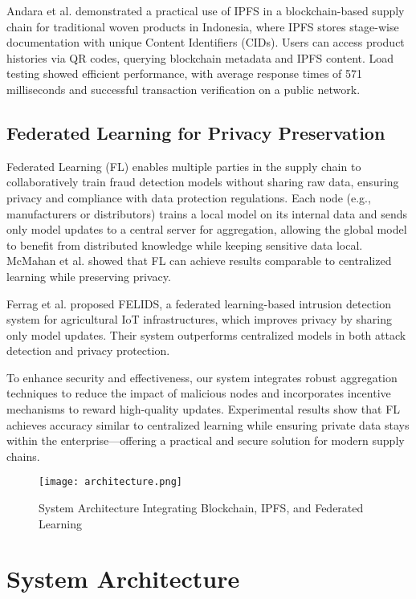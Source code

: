 \documentclass[conference]{IEEEtran}
\begin{document}
Andara et al. \cite{andara2022blockchain} demonstrated a practical use of IPFS in a blockchain-based supply chain for traditional woven products in Indonesia, where IPFS stores stage-wise documentation with unique Content Identifiers (CIDs). Users can access product histories via QR codes, querying blockchain metadata and IPFS content. Load testing showed efficient performance, with average response times of 571 milliseconds and successful transaction verification on a public network.

\subsection{Federated Learning for Privacy Preservation}  
Federated Learning (FL) enables multiple parties in the supply chain to collaboratively train fraud detection models without sharing raw data, ensuring privacy and compliance with data protection regulations. Each node (e.g., manufacturers or distributors) trains a local model on its internal data and sends only model updates to a central server for aggregation, allowing the global model to benefit from distributed knowledge while keeping sensitive data local. McMahan et al. \cite{mcmahan2017communication} showed that FL can achieve results comparable to centralized learning while preserving privacy.

Ferrag et al. \cite{ferrag2020deep} proposed FELIDS, a federated learning-based intrusion detection system for agricultural IoT infrastructures, which improves privacy by sharing only model updates. Their system outperforms centralized models in both attack detection and privacy protection.

To enhance security and effectiveness, our system integrates robust aggregation techniques to reduce the impact of malicious nodes and incorporates incentive mechanisms to reward high-quality updates. Experimental results show that FL achieves accuracy similar to centralized learning while ensuring private data stays within the enterprise—offering a practical and secure solution for modern supply chains.

\begin{figure*}[htbp]
  \centering
  \texttt{[image: architecture.png]}
  \caption{System Architecture Integrating Blockchain, IPFS, and Federated Learning}
  \label{fig:system-diagram}
\end{figure*}

\section{System Architecture}
\end{document}
